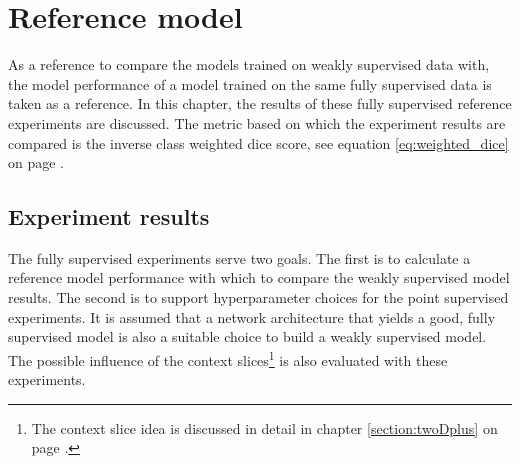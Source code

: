 \chapter{Reference model\label{sec:reference_model}}\thispagestyle{empty}
\par{
    As a reference to compare the models trained on weakly supervised data with, the model performance of a model trained on the same fully supervised data is taken as a reference.
    In this chapter, the results of these fully supervised reference experiments are discussed.
    The metric based on which the experiment results are compared is the inverse class weighted dice score, see equation \ref{eq:weighted_dice} on page \pageref{eq:weighted_dice}.
}


\section{Experiment results}
\par{
    The fully supervised experiments serve two goals.
    The first is to calculate a reference model performance with which to compare the weakly supervised model results.
    The second is to support hyperparameter choices for the point supervised experiments.
    It is assumed that a network architecture that yields a good, fully supervised model is also a suitable choice to build a weakly supervised model.
    The possible influence of the context slices\footnote{The context slice idea is discussed in detail in chapter \ref{section:twoDplus} on page \pageref{section:twoDplus}.} is also evaluated with these experiments.
}



